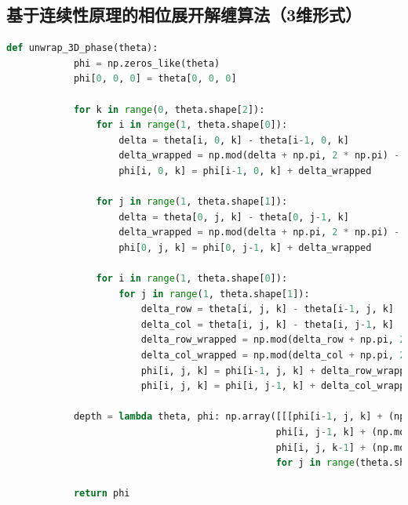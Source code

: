 \documentclass[a4paper]{article}
\begin{document}
	\subsection{基于连续性原理的相位展开解缠算法（3维形式）}
	\begin{lstlisting}[language=python,columns=fullflexible,frame=shadowbox]
		def unwrap_3D_phase(theta):
			phi = np.zeros_like(theta)
			phi[0, 0, 0] = theta[0, 0, 0]
				
			for k in range(0, theta.shape[2]):
				for i in range(1, theta.shape[0]):
					delta = theta[i, 0, k] - theta[i-1, 0, k]
					delta_wrapped = np.mod(delta + np.pi, 2 * np.pi) - np.pi
					phi[i, 0, k] = phi[i-1, 0, k] + delta_wrapped
				
				for j in range(1, theta.shape[1]):
					delta = theta[0, j, k] - theta[0, j-1, k]
					delta_wrapped = np.mod(delta + np.pi, 2 * np.pi) - np.pi
					phi[0, j, k] = phi[0, j-1, k] + delta_wrapped
					
				for i in range(1, theta.shape[0]):
					for j in range(1, theta.shape[1]):
						delta_row = theta[i, j, k] - theta[i-1, j, k]
						delta_col = theta[i, j, k] - theta[i, j-1, k]
						delta_row_wrapped = np.mod(delta_row + np.pi, 2 * np.pi) - np.pi
						delta_col_wrapped = np.mod(delta_col + np.pi, 2 * np.pi) - np.pi
						phi[i, j, k] = phi[i-1, j, k] + delta_row_wrapped
						phi[i, j, k] = phi[i, j-1, k] + delta_col_wrapped
					
			depth = lambda theta, phi: np.array([[[phi[i-1, j, k] + (np.mod(theta[i, j, k] - theta[i-1, j, k] + np.pi, 2 * np.pi) - np.pi) if i > 0 else phi[i, j, k],
												phi[i, j-1, k] + (np.mod(theta[i, j, k] - theta[i, j-1, k] + np.pi, 2 * np.pi) - np.pi) if j > 0 else phi[i, j, k],
												phi[i, j, k-1] + (np.mod(theta[i, j, k] - theta[i, j, k-1] + np.pi, 2 * np.pi) - np.pi) if k > 0 else phi[i, j, k]]
												for j in range(theta.shape[1])]])
			
			return phi
	\end{lstlisting}
\end{document}
